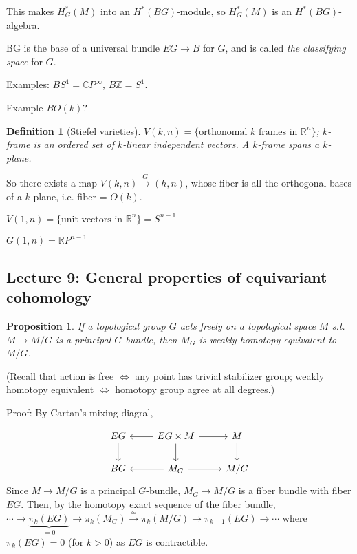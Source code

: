 \documentclass{article}
\theoremstyle{mystyle}
\newtheorem*{definition}{Definition}%
\newtheorem*{proposition*}{Proposition}
\theoremstyle{remark}
\numberwithin{equation}{section}
\begin{document}
This makes $H^*_G(M)$ into an $H^*(BG)$-module, so $H^*_G(M)$ is an $H^*(BG)$-algebra.

BG is the base of a universal bundle $EG\rightarrow B$ for $G$, and is called \emph{the} \emph{classifying space} for $G$. 


Examples: $BS^1 = \mathbb{C}P^\infty$, $B\mathbb{Z} = S^1$.

Example $BO(k)?$ 


\begin{definition}[Stiefel varieties] $V(k,n) = \{\text{orthonomal }k \text{ frames in } \mathbb{R}^n\}$;
$k$-frame is an ordered set of $k$-linear independent vectors.
A $k$-frame spans a $k$-plane.
\end{definition}

So there exists a map $V(k,n)\xrightarrow G(h,n)$, whose fiber is all the orthogonal bases of a $k$-plane, i.e. fiber = $O(k)$.

$V(1,n) = \{\text{unit vectors in }\mathbb{R}^n\} = S^{n-1}$

$G(1,n) = \mathbb{R}P^{n-1}$



\subsection{Lecture 9: General properties of equivariant cohomology}


\begin{proposition*} If a topological group $G$ acts freely on a topological space $M$ s.t. $M\rightarrow M/G$ is a principal $G$-bundle, then $M_G$ is weakly homotopy equivalent to $M/G$. 
\end{proposition*}

(Recall that action is free $\Leftrightarrow$ any point has trivial stabilizer group; weakly homotopy equivalent $\Leftrightarrow$ homotopy group agree at all degrees.)

Proof: By Cartan's mixing diagral,

$$
\begin{tikzcd}
EG \ar[d] & \ar[l]EG\times M\ar[r]\ar[d] & M \ar[d]\\
BG& \ar[l] M_G \ar[r] & M/G 
\end{tikzcd}
$$
Since $M\rightarrow M/G$ is a principal $G$-bundle, $M_G\rightarrow M/G$ is a fiber bundle with fiber $EG$. Then, by the homotopy exact sequence of the fiber bundle, $\cdots \rightarrow \underbrace{\pi_k(EG)}_{=0}\rightarrow \pi_k(M_G)\xrightarrow{\simeq} \pi_k(M/G)\rightarrow \pi_{k-1}(EG)\rightarrow \cdots$ where $\pi_k(EG)=0$ (for $k>0$) as $EG$ is contractible.
\end{document}
